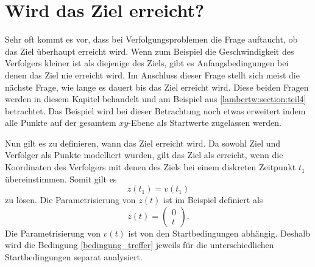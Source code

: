 %
%
%
\section{Wird das Ziel erreicht?
\label{lambertw:section:Wird_das_Ziel_erreicht}}
%
Sehr oft kommt es vor, dass bei Verfolgungsproblemen die Frage auftaucht, ob das Ziel überhaupt erreicht wird.
Wenn zum Beispiel die Geschwindigkeit des Verfolgers kleiner ist als diejenige des Ziels, gibt es Anfangsbedingungen bei denen das Ziel nie erreicht wird.
Im Anschluss dieser Frage stellt sich meist die nächste Frage, wie lange es dauert bis das Ziel erreicht wird.
Diese beiden Fragen werden in diesem Kapitel behandelt und am Beispiel aus \ref{lambertw:section:teil4} betrachtet.
Das Beispiel wird bei dieser Betrachtung noch etwas erweitert indem alle Punkte auf der gesamtem $xy$-Ebene als Startwerte zugelassen werden.

Nun gilt es zu definieren, wann das Ziel erreicht wird.
Da sowohl Ziel und Verfolger als Punkte modelliert wurden, gilt das Ziel als erreicht, wenn die Koordinaten des Verfolgers mit denen des Ziels bei einem diskreten Zeitpunkt $t_1$ übereinstimmen.
Somit gilt es
%
\begin{equation}
    z(t_1)=v(t_1)
    \label{bedingung_treffer}
\end{equation}
%
zu lösen.
Die Parametrisierung von $z(t)$ ist im Beispiel definiert als
\begin{equation}
    z(t)
    =
    \left( \begin{array}{c} 0 \\ t \end{array} \right)\text{.}
\end{equation}
%
Die Parametrisierung von $v(t)$ ist von den Startbedingungen abhängig. Deshalb wird die Bedingung \eqref{bedingung_treffer} jeweils für die unterschiedlichen Startbedingungen separat analysiert.
%
